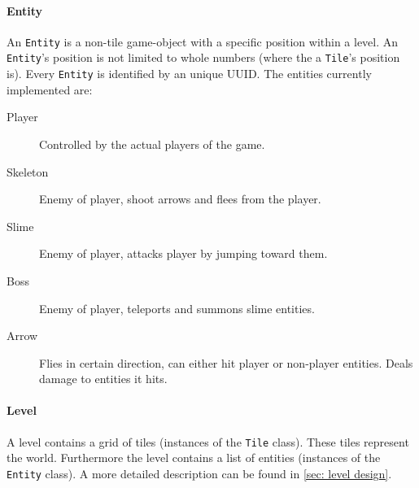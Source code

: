 \documentclass[../main.tex]{subfiles}
\begin{document}
        \paragraph{Entity} An \texttt{Entity} is a non-tile game-object with a specific position within a level. An \texttt{Entity}'s position is not limited to whole numbers (where the a \texttt{Tile}'s position is). Every \texttt{Entity} is identified by an unique UUID. The entities currently implemented are:
        \begin{description}
            \item[Player] Controlled by the actual players of the game.
            \item[Skeleton] Enemy of player, shoot arrows and flees from the player.
            \item[Slime] Enemy of player, attacks player by jumping toward them.
            \item[Boss] Enemy of player, teleports and summons slime entities.
            \item[Arrow] Flies in certain direction, can either hit player or non-player entities. Deals damage to entities it hits.
        \end{description}

        \paragraph{Level}
        A level contains a grid of tiles (instances of the \texttt{Tile} class). These tiles represent the world. Furthermore the level contains a list of entities (instances of the 
        \texttt{Entity} class). A more detailed description can be found in \ref{sec: level design}.
\end{document}
